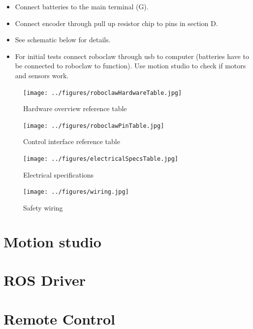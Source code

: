 \documentclass[12pt,letterpaper,oneside]{article}
\begin{document}
\begin{itemize}
    \item Connect batteries to the main terminal (G).
    \item Connect encoder through pull up resistor chip to pins in section D.
    \item See schematic below for details.
    \item For initial tests connect roboclaw through usb to computer (batteries have to be connected to roboclaw to function). Use motion studio to check if motors and sensors work.
\end{itemize}

\newpage
\begin{figure}[h]
    \centering
    \texttt{[image: ../figures/roboclawHardwareTable.jpg]}
    \caption{Hardware overview reference table}
    \label{fig:my_label}
\end{figure}

\begin{figure}[h]
    \centering
    \texttt{[image: ../figures/roboclawPinTable.jpg]}
    \caption{Control interface reference table}
    \label{fig:my_label}
\end{figure}

\newpage
\begin{figure}[h]
    \centering
    \texttt{[image: ../figures/electricalSpecsTable.jpg]}
    \caption{Electrical specifications}
    \label{fig:my_label}
\end{figure}

\newpage
\begin{figure}[h]
    \centering
    \texttt{[image: ../figures/wiring.jpg]}
    \caption{Safety wiring}
    \label{fig:my_label}
\end{figure}

\section{Motion studio}

\section{ROS Driver}

\section{Remote Control}

\newpage
\printbibliography
\end{document}
